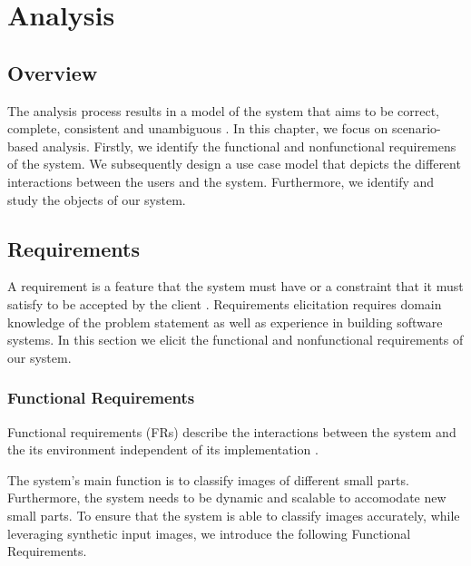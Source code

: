 \chapter{Analysis}


\section{Overview}
The analysis process results in a model of the system that aims to be correct, complete, consistent and unambiguous \cite{bruegge2004object}. In this chapter, we focus on scenario-based analysis. Firstly, we identify the functional and nonfunctional requiremens of the system. We subsequently design a use case model that depicts the different interactions between the users and the system. Furthermore, we identify and study the objects of our system.

\section{Requirements}
A requirement is a feature that the system must have or a constraint that it must satisfy to be accepted by the client \cite{bruegge2004object}. Requirements elicitation requires domain knowledge of the problem statement as well as experience in building software systems. In this section we elicit the functional and nonfunctional requirements of our system.

\subsection{Functional Requirements}

Functional requirements (FRs) describe the interactions between the system and the its environment independent of its implementation \cite{bruegge2004object}.

The system's main function is to classify images of different small parts. Furthermore, the system needs to be dynamic and scalable to accomodate new small parts. To ensure that the system is able to classify images accurately, while leveraging synthetic input images, we introduce the following Functional Requirements.

